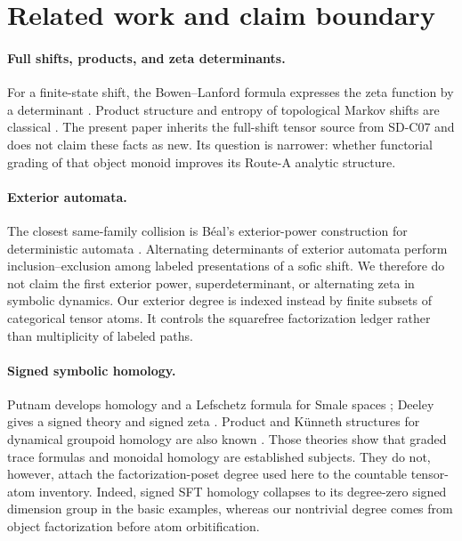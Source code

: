 \section{Related work and claim boundary}

\paragraph{Full shifts, products, and zeta determinants.}
For a finite-state shift, the Bowen--Lanford formula expresses the zeta
function by a determinant \citep{bowenlanford1970}. Product structure and
entropy of topological Markov shifts are classical
\citep{lind1984}. The present paper inherits the full-shift tensor source
from SD-C07 and does not claim these facts as new. Its question is narrower:
whether functorial grading of that object monoid improves its Route-A
analytic structure.

\paragraph{Exterior automata.}
The closest same-family collision is B\'eal's exterior-power construction
for deterministic automata \citep{beal1995}. Alternating determinants of
exterior automata perform inclusion--exclusion among labeled presentations
of a sofic shift. We therefore do not claim the first exterior power,
superdeterminant, or alternating zeta in symbolic dynamics. Our exterior
degree is indexed instead by finite subsets of categorical tensor atoms.
It controls the squarefree factorization ledger rather than multiplicity of
labeled paths.

\paragraph{Signed symbolic homology.}
Putnam develops homology and a Lefschetz formula for Smale spaces
\citep{putnam2014}; Deeley gives a signed theory and signed zeta
\citep{deeley2018}. Product and K\"unneth structures for dynamical groupoid
homology are also known \citep{proiettiyamashita2025}. Those theories show
that graded trace formulas and monoidal homology are established subjects.
They do not, however, attach the factorization-poset degree used here to the
countable tensor-atom inventory. Indeed, signed SFT homology collapses to its
degree-zero signed dimension group in the basic examples, whereas our
nontrivial degree comes from object factorization before atom orbitification.


